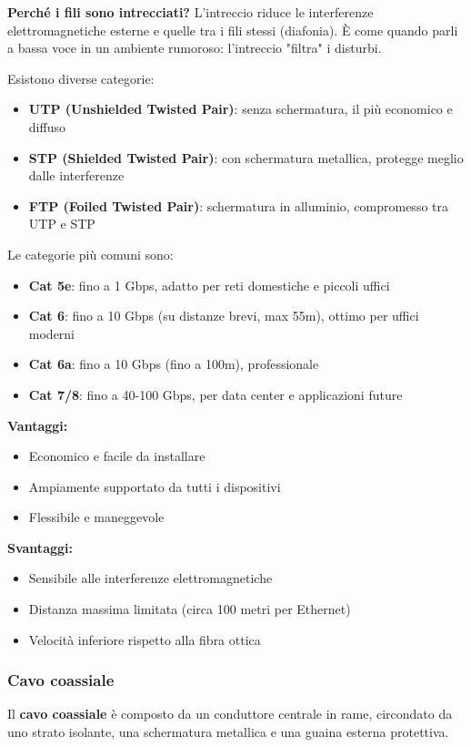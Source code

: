 \documentclass[12pt,a4paper]{article}
\begin{document}
\textbf{Perché i fili sono intrecciati?} L'intreccio riduce le interferenze elettromagnetiche esterne e quelle tra i fili stessi (diafonia). È come quando parli a bassa voce in un ambiente rumoroso: l'intreccio "filtra" i disturbi.

Esistono diverse categorie:
\begin{itemize}
    \item \textbf{UTP (Unshielded Twisted Pair)}: senza schermatura, il più economico e diffuso
    \item \textbf{STP (Shielded Twisted Pair)}: con schermatura metallica, protegge meglio dalle interferenze
    \item \textbf{FTP (Foiled Twisted Pair)}: schermatura in alluminio, compromesso tra UTP e STP
\end{itemize}

Le categorie più comuni sono:
\begin{itemize}
    \item \textbf{Cat 5e}: fino a 1 Gbps, adatto per reti domestiche e piccoli uffici
    \item \textbf{Cat 6}: fino a 10 Gbps (su distanze brevi, max 55m), ottimo per uffici moderni
    \item \textbf{Cat 6a}: fino a 10 Gbps (fino a 100m), professionale
    \item \textbf{Cat 7/8}: fino a 40-100 Gbps, per data center e applicazioni future
\end{itemize}

\textbf{Vantaggi:}
\begin{itemize}
    \item Economico e facile da installare
    \item Ampiamente supportato da tutti i dispositivi
    \item Flessibile e maneggevole
\end{itemize}

\textbf{Svantaggi:}
\begin{itemize}
    \item Sensibile alle interferenze elettromagnetiche
    \item Distanza massima limitata (circa 100 metri per Ethernet)
    \item Velocità inferiore rispetto alla fibra ottica
\end{itemize}

\subsubsection*{Cavo coassiale}
Il \textbf{cavo coassiale} è composto da un conduttore centrale in rame, circondato da uno strato isolante, una schermatura metallica e una guaina esterna protettiva.
\end{document}
